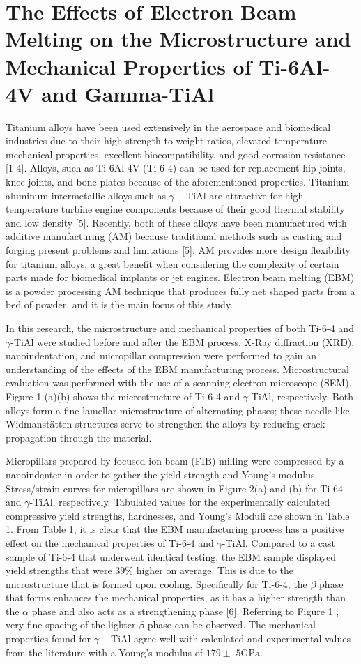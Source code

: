 \documentclass[10pt]{article}
\begin{document}
\section*{The Effects of Electron Beam Melting on the Microstructure and Mechanical Properties of Ti-6Al-4V and Gamma-TiAl }
Titanium alloys have been used extensively in the aerospace and biomedical industries due to their high strength to weight ratios, elevated temperature mechanical properties, excellent biocompatibility, and good corrosion resistance [1-4]. Alloys, such as Ti-6Al-4V (Ti-6-4) can be used for replacement hip joints, knee joints, and bone plates because of the aforementioned properties. Titanium-aluminum intermetallic alloys such as $\gamma-\mathrm{TiAl}$ are attractive for high temperature turbine engine components because of their good thermal stability and low density [5]. Recently, both of these alloys have been manufactured with additive manufacturing (AM) because traditional methods such as casting and forging present problems and limitations [5]. AM provides more design flexibility for titanium alloys, a great benefit when considering the complexity of certain parts made for biomedical implants or jet engines. Electron beam melting (EBM) is a powder processing AM technique that produces fully net shaped parts from a bed of powder, and it is the main focus of this study.

In this research, the microstructure and mechanical properties of both Ti-6-4 and $\gamma$-TiAl were studied before and after the EBM process. X-Ray diffraction (XRD), nanoindentation, and micropillar compression were performed to gain an understanding of the effects of the EBM manufacturing process. Microstructural evaluation was performed with the use of a scanning electron microscope (SEM). Figure 1 (a)(b) shows the microstructure of Ti-6-4 and $\gamma$-TiAl, respectively. Both alloys form a fine lamellar microstructure of alternating phases; these needle like Widmanstätten structures serve to strengthen the alloys by reducing crack propagation through the material.

Micropillars prepared by focused ion beam (FIB) milling were compressed by a nanoindenter in order to gather the yield strength and Young's modulus. Stress/strain curves for micropillars are shown in Figure 2(a) and (b) for Ti-64 and $\gamma$-TiAl, respectively. Tabulated values for the experimentally calculated compressive yield strengths, hardnesses, and Young's Moduli are shown in Table 1. From Table 1, it is clear that the EBM manufacturing process has a positive effect on the mechanical properties of Ti-6-4 and $\gamma$-TiAl. Compared to a cast sample of Ti-6-4 that underwent identical testing, the EBM sample displayed yield strengths that were $39 \%$ higher on average. This is due to the microstructure that is formed upon cooling. Specifically for Ti-6-4, the $\beta$ phase that forms enhances the mechanical properties, as it has a higher strength than the $\alpha$ phase and also acts as a strengthening phase [6]. Referring to Figure 1 , very fine spacing of the lighter $\beta$ phase can be observed. The mechanical properties found for $\gamma-\mathrm{TiAl}$ agree well with calculated and experimental values from the literature with a Young's modulus of $179 \pm$ $5 \mathrm{GPa}$.
\end{document}
